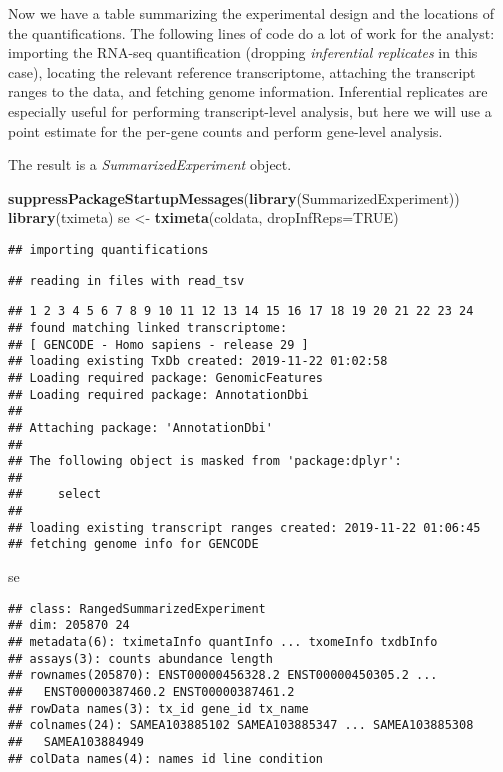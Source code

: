 \documentclass[
]{article}
\newenvironment{Shaded}{}{}
\newcommand{\DataTypeTok}[1]{\textcolor[rgb]{0.56,0.13,0.00}{#1}}
\newcommand{\KeywordTok}[1]{\textcolor[rgb]{0.00,0.44,0.13}{\textbf{#1}}}
\newcommand{\NormalTok}[1]{#1}
\newcommand{\OtherTok}[1]{\textcolor[rgb]{0.00,0.44,0.13}{#1}}
\newcommand{\StringTok}[1]{\textcolor[rgb]{0.25,0.44,0.63}{#1}}
\begin{document}
Now we have a table summarizing the experimental design and the locations
of the quantifications. The following lines of code do a lot of work for the
analyst: importing the RNA-seq quantification (dropping \emph{inferential
replicates} in this case), locating the relevant reference transcriptome,
attaching the transcript ranges to the data, and fetching genome information.
Inferential replicates are especially useful for performing transcript-level
analysis, but here we will use a point estimate for the per-gene counts and
perform gene-level analysis.

The result is a \emph{SummarizedExperiment} object.

\begin{Shaded}
\begin{Highlighting}[]
\KeywordTok{suppressPackageStartupMessages}\NormalTok{(}\KeywordTok{library}\NormalTok{(SummarizedExperiment))}
\KeywordTok{library}\NormalTok{(tximeta)}
\NormalTok{se <-}\StringTok{ }\KeywordTok{tximeta}\NormalTok{(coldata, }\DataTypeTok{dropInfReps=}\OtherTok{TRUE}\NormalTok{)}
\end{Highlighting}
\end{Shaded}

\begin{verbatim}
## importing quantifications
\end{verbatim}

\begin{verbatim}
## reading in files with read_tsv
\end{verbatim}

\begin{verbatim}
## 1 2 3 4 5 6 7 8 9 10 11 12 13 14 15 16 17 18 19 20 21 22 23 24 
## found matching linked transcriptome:
## [ GENCODE - Homo sapiens - release 29 ]
## loading existing TxDb created: 2019-11-22 01:02:58
## Loading required package: GenomicFeatures
## Loading required package: AnnotationDbi
## 
## Attaching package: 'AnnotationDbi'
## 
## The following object is masked from 'package:dplyr':
## 
##     select
## 
## loading existing transcript ranges created: 2019-11-22 01:06:45
## fetching genome info for GENCODE
\end{verbatim}

\begin{Shaded}
\begin{Highlighting}[]
\NormalTok{se}
\end{Highlighting}
\end{Shaded}

\begin{verbatim}
## class: RangedSummarizedExperiment 
## dim: 205870 24 
## metadata(6): tximetaInfo quantInfo ... txomeInfo txdbInfo
## assays(3): counts abundance length
## rownames(205870): ENST00000456328.2 ENST00000450305.2 ...
##   ENST00000387460.2 ENST00000387461.2
## rowData names(3): tx_id gene_id tx_name
## colnames(24): SAMEA103885102 SAMEA103885347 ... SAMEA103885308
##   SAMEA103884949
## colData names(4): names id line condition
\end{verbatim}
\end{document}
